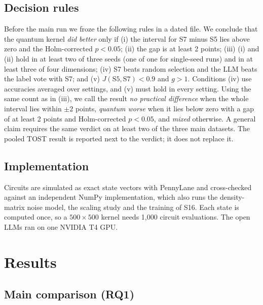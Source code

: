 \subsection{Decision rules}
Before the main run we froze the following rules in a dated file. We conclude that the quantum kernel
\emph{did better} only if (i) the interval for S7 minus S5 lies above zero and the Holm-corrected
$p<0.05$; (ii) the gap is at least 2 points; (iii) (i) and (ii) hold in at least two of three seeds
(one of one for single-seed runs) and in at least three of four dimensions; (iv) S7 beats random
selection and the LLM beats the label vote with S7; and (v) $J(\mathrm{S5},\mathrm{S7})<0.9$ and $g>1$.
Conditions (iv) use accuracies averaged over settings, and (v) must hold in every setting. Using the
same count as in (iii), we call the result \emph{no practical difference} when the whole interval lies
within $\pm2$ points, \emph{quantum worse} when it lies below zero with a gap of at least 2 points and
Holm-corrected $p<0.05$, and \emph{mixed} otherwise. A general claim requires the same verdict on at least
two of the three main datasets. The pooled TOST result is reported next to the verdict; it does not
replace it.

\subsection{Implementation}
Circuits are simulated as exact state vectors with PennyLane \cite{bergholm2018pennylane} and
cross-checked against an independent NumPy implementation, which also runs the density-matrix noise
model, the scaling study and the training of S16. Each state is computed once, so a $500\times500$
kernel needs 1{,}000 circuit evaluations. The open LLMs ran on one NVIDIA T4 GPU. \TImplementation{}

\section{Results}

\subsection{Main comparison (RQ1)}

\begin{table}[t]
\centering
\caption{LLM accuracy and macro-F1 (\%) with the main LLM, $k=4$, averaged over $d\in\{2,\dots,5\}$.
TREC shows mean$\pm$std over three seeds; the other datasets use seed 0. AUROC$_\mathrm{ret}$ is the
retrieval AUROC of Eq.~\eqref{eq:auroc} ($\times100$). Best value per column in bold.}
\label{tab:main}
\footnotesize

\end{table}

